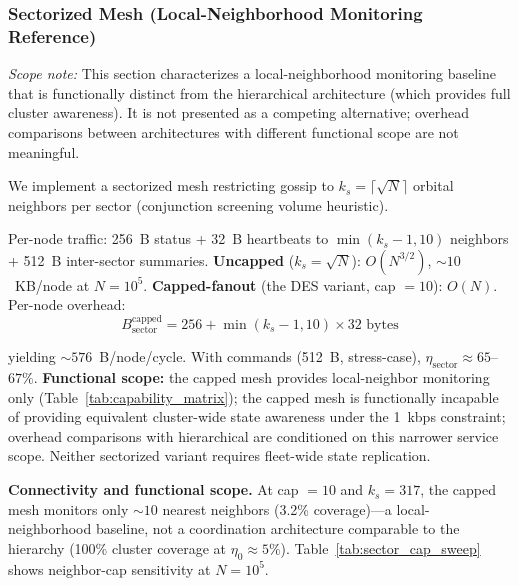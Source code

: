 \documentclass[journal]{IEEEtran}
\begin{document}
\subsubsection{Sectorized Mesh (Local-Neighborhood Monitoring Reference)}
\label{sec:sectorized_mesh_model}

\emph{Scope note:} This section characterizes a local-neighborhood monitoring baseline that is functionally distinct from the hierarchical architecture (which provides full cluster awareness). It is not presented as a competing alternative; overhead comparisons between architectures with different functional scope are not meaningful.

We implement a sectorized mesh restricting gossip to $k_s = \lceil\sqrt{N}\rceil$ orbital neighbors per sector (conjunction screening volume heuristic).

Per-node traffic: 256~B status + 32~B heartbeats to $\min(k_s - 1, 10)$ neighbors + 512~B inter-sector summaries. \textbf{Uncapped} ($k_s = \sqrt{N}$): $O(N^{3/2})$, ${\sim}10$~KB/node at $N = 10^5$. \textbf{Capped-fanout} (the DES variant, cap $= 10$): $O(N)$. Per-node overhead:
\begin{equation}
    B_{\text{sector}}^{\text{capped}} = 256 + \min(k_s - 1, 10) \times 32 \text{~bytes}
    \label{eq:sector_overhead}
\end{equation}

\noindent yielding ${\sim}576$~B/node/cycle. With commands (512~B, stress-case), $\eta_{\text{sector}} \approx 65$--$67\%$. \textbf{Functional scope:} the capped mesh provides local-neighbor monitoring only (Table~\ref{tab:capability_matrix}); the capped mesh is functionally incapable of providing equivalent cluster-wide state awareness under the 1~kbps constraint; overhead comparisons with hierarchical are conditioned on this narrower service scope. Neither sectorized variant requires fleet-wide state replication.

\textbf{Connectivity and functional scope.} At cap $= 10$ and $k_s = 317$, the capped mesh monitors only ${\sim}10$ nearest neighbors (3.2\% coverage)---a local-neighborhood baseline, not a coordination architecture comparable to the hierarchy (100\% cluster coverage at $\eta_0 \approx 5\%$). Table~\ref{tab:sector_cap_sweep} shows neighbor-cap sensitivity at $N = 10^5$.
\end{document}

